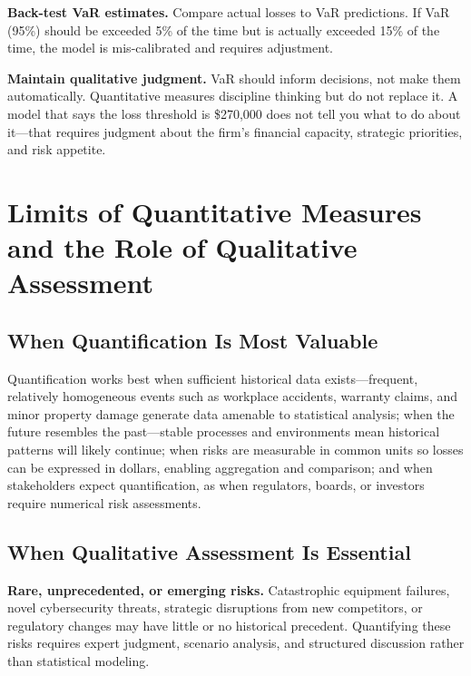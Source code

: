 \documentclass[11pt,openany]{book}
\begin{document}
\textbf{Back-test VaR estimates.} Compare actual losses to VaR predictions. If
VaR (95\%) should be exceeded 5\% of the time but is actually exceeded 15\% of
the time, the model is mis-calibrated and requires adjustment.

\textbf{Maintain qualitative judgment.} VaR should inform decisions, not make
them automatically. Quantitative measures discipline thinking but do not
replace it. A model that says the loss threshold is \$270,000 does not tell you
what to do about it---that requires judgment about the firm's financial
capacity, strategic priorities, and risk appetite.

\section{Limits of Quantitative Measures and the Role of Qualitative Assessment}
\label{sec:qual-quant-integration}

\subsection{When Quantification Is Most Valuable}
\label{subsec:when-quantification}

Quantification works best when sufficient historical data exists---frequent,
relatively homogeneous events such as workplace accidents, warranty claims, and
minor property damage generate data amenable to statistical analysis; when the
future resembles the past---stable processes and environments mean historical
patterns will likely continue; when risks are measurable in common units so
losses can be expressed in dollars, enabling aggregation and comparison; and
when stakeholders expect quantification, as when regulators, boards, or
investors require numerical risk assessments.

\subsection{When Qualitative Assessment Is Essential}
\label{subsec:when-qualitative}

\textbf{Rare, unprecedented, or emerging risks.} Catastrophic equipment
failures, novel cybersecurity threats, strategic disruptions from new
competitors, or regulatory changes may have little or no historical precedent.
Quantifying these risks requires expert judgment, scenario analysis, and
structured discussion rather than statistical modeling.
\end{document}

